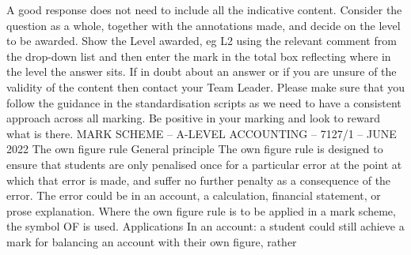 \documentclass{article}
\begin{document}
 \newline
A good response does not need to include all the indicative content.  \newline
 \newline
Consider the question as a whole, together with the annotations made, and decide on the level to be \newline
awarded. \newline
 \newline
Show the Level awarded, eg L2 using the relevant comment from the drop-down list and then enter the \newline
mark in the total box reflecting where in the level the answer sits. \newline
 \newline
If in doubt about an answer or if you are unsure of the validity of the content then contact your Team \newline
Leader.  Please make sure that you follow the guidance in the standardisation scripts as we need to \newline
have a consistent approach across all marking. \newline
 \newline
Be positive in your marking and look to reward what is there. \newline
 \newline
 \newline
MARK SCHEME – A-LEVEL ACCOUNTING – 7127/1 – JUNE 2022  \newline
The own figure rule  \newline
 \newline
General principle  \newline
 \newline
The own figure rule is designed to ensure that students are only penalised once for a particular error at \newline
the point at which that error is made, and suffer no further penalty as a consequence of the error.  The \newline
error could be in an account, a calculation, financial statement, or prose explanation.  Where the own \newline
figure rule is to be applied in a mark scheme, the symbol OF is used.  \newline
 \newline
Applications  \newline
 \newline
In an account: a student could still achieve a mark for balancing an account with their own figure, rather \newline
\end{document}
